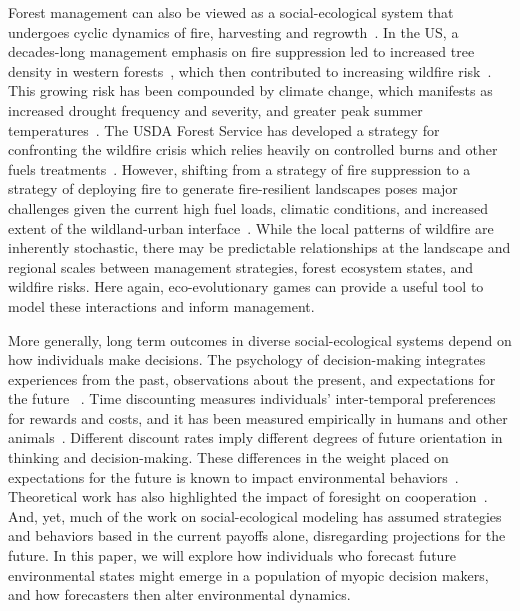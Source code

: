 \documentclass{article}
\begin{document}
Forest management can also be viewed as a social-ecological system that undergoes cyclic dynamics of fire, harvesting and regrowth~\citep{luce2012climate,steelman2016}. In the US, a decades-long management emphasis on fire suppression led to increased tree density in western forests~\citep{fellows2008}, which then contributed to increasing wildfire risk~\citep{marlon2012}. This growing risk has been compounded by climate change, which manifests as increased drought frequency and severity, and greater peak summer temperatures~\citep{mckenzie2004climatic}. The USDA Forest Service has developed a strategy for confronting the wildfire crisis which relies heavily on controlled burns and other fuels treatments~\citep{wildfirecrisis2022}. However, shifting from a strategy of fire suppression to a strategy of deploying fire to generate fire-resilient landscapes poses major challenges given the current high fuel loads, climatic conditions, and increased extent of the wildland-urban interface~\citep{radeloff2018rapid}. While the local patterns of wildfire are inherently stochastic, there may be predictable relationships at the landscape and regional scales between management strategies, forest ecosystem states, and wildfire risks. Here again, eco-evolutionary games can provide a useful tool to model these interactions and inform management.    

More generally, long term outcomes in diverse social-ecological systems depend on how individuals make decisions. The psychology of decision-making integrates experiences from the past, observations about the present, and expectations for the future ~\citep{zimbardo1999}. Time discounting measures individuals' inter-temporal preferences for rewards and costs, and it has been measured empirically in humans and other animals~\citep{mischel1989, odum2011}. Different discount rates imply different degrees of future orientation in thinking and decision-making. These differences in the weight placed on expectations for the future is known to impact environmental behaviors~\citep{carmi2013,carmi2014,enzler2019}. Theoretical work has also highlighted the impact of foresight on cooperation~\citep{perry2020foresight}. And, yet, much of the work on social-ecological modeling has assumed strategies and behaviors based in the current payoffs alone, disregarding projections for the future. In this paper, we will explore how individuals who forecast future environmental states might emerge in a population of myopic decision makers, and how forecasters then alter environmental dynamics.
\end{document}
